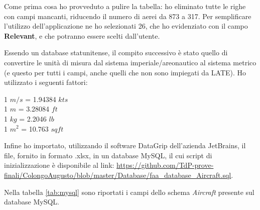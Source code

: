 \documentclass[a4paper, 12pt]{article}
\begin{document}
		Come prima cosa ho provveduto a pulire la tabella: ho eliminato tutte le righe con campi mancanti, riducendo il numero di aerei da 873 a 317. Per semplificare l’utilizzo dell’applicazione ne ho selezionati 26, che ho evidenziato con il campo \textbf{Relevant}, e che potranno essere scelti dall'utente.
		
		Essendo un database statunitense, il compito successivo è stato quello di convertire le unità di misura dal sistema imperiale/areonautico al sistema metrico (e questo per tutti i campi, anche quelli che non sono impiegati da LATE). Ho utilizzato i seguenti fattori:
		\begin{center}
				1 $m/s$ = 1.94384 $kts$ \\
				1 $m$ = 3.28084 $ft$ \\
				1 $kg$ = 2.2046 $lb$ \\
				1 $m^2$ = 10.763 $sqft$ \\
		\end{center}

		Infine ho importato, utilizzando il software DataGrip dell’azienda JetBrains, il file, fornito in formato .xlsx, in un database MySQL, il cui script di inizializzazione è disponibile al link: \url{https://github.com/TdP-prove-finali/ColongoAugusto/blob/master/Database/faa_database_Aircraft.sql}. 

		Nella tabella \ref{tab:mysql} sono riportati i campi dello schema \textit{Aircraft} presente sul database MySQL.

\begin{table}[H]

\caption{Campi MySQL utilizzati da LATE}
\label{tab:mysql}

\bgroup
\def\arraystretch{1.5}

\egroup
\end{table}
\end{document}

